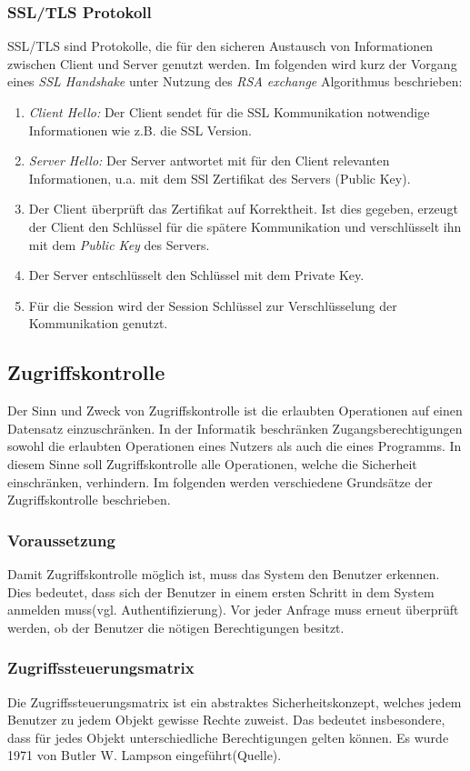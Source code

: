 \subsubsection{SSL/TLS Protokoll}
SSL/TLS sind Protokolle, die für den sicheren Austausch von Informationen zwischen Client und Server genutzt werden. Im folgenden wird kurz der Vorgang eines \textit{SSL Handshake} unter Nutzung des \textit{RSA exchange} Algorithmus beschrieben:
\begin{enumerate}
\item \textit{Client Hello:} Der Client sendet für die SSL Kommunikation notwendige Informationen wie z.B. die SSL Version.
\item \textit{Server Hello:} Der Server antwortet mit für den Client relevanten Informationen, u.a. mit dem SSl Zertifikat des Servers (Public Key).
\item  Der Client überprüft das Zertifikat auf Korrektheit.  Ist dies gegeben, erzeugt der Client den Schlüssel für die spätere Kommunikation und verschlüsselt ihn mit dem \textit{Public Key} des Servers.
\item Der Server entschlüsselt den Schlüssel mit dem Private Key.
\item Für die Session wird der Session Schlüssel zur Verschlüsselung der Kommunikation genutzt.
\end{enumerate}	
\subsection*{Zugriffskontrolle}

Der Sinn und Zweck von Zugriffskontrolle ist die erlaubten Operationen auf einen Datensatz einzuschränken. In der Informatik beschränken Zugangsberechtigungen sowohl die erlaubten Operationen eines Nutzers als auch die eines Programms. In diesem Sinne soll Zugriffskontrolle alle Operationen, welche die Sicherheit einschränken, verhindern. Im folgenden werden verschiedene Grundsätze der Zugriffskontrolle beschrieben.

\subsubsection{Voraussetzung}
Damit Zugriffskontrolle möglich ist, muss das System den Benutzer erkennen. Dies bedeutet, dass sich der Benutzer in einem ersten Schritt in dem System anmelden muss(vgl. Authentifizierung). Vor jeder Anfrage muss erneut überprüft werden, ob der Benutzer die nötigen Berechtigungen besitzt.
\subsubsection{Zugriffssteuerungsmatrix}
Die Zugriffssteuerungsmatrix ist ein abstraktes Sicherheitskonzept, welches jedem Benutzer zu jedem Objekt gewisse Rechte zuweist. Das bedeutet insbesondere, dass für jedes Objekt unterschiedliche Berechtigungen gelten können. Es wurde 1971 von Butler W. Lampson eingeführt(Quelle).

